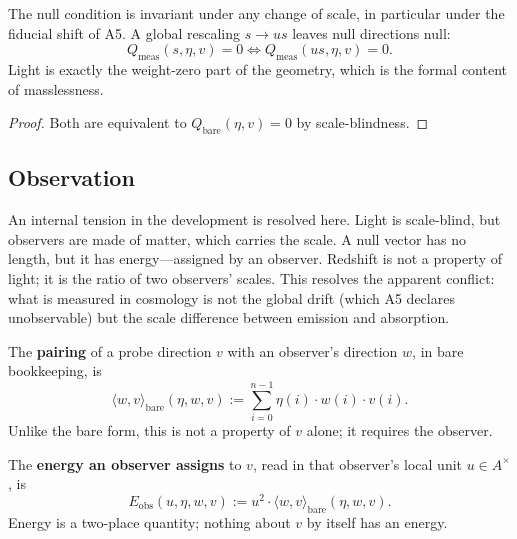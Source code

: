 \begin{theorem}
The null condition is invariant under any change of scale, in particular under the fiducial shift of A5. A global rescaling $s \to us$ leaves null directions null:
\begin{equation}
Q_{\text{meas}}(s, \eta, v) = 0 \iff Q_{\text{meas}}(us, \eta, v) = 0 .
\end{equation}
Light is exactly the weight-zero part of the geometry, which is the formal content of masslessness.
\end{theorem}

\begin{proof}
Both are equivalent to $Q_{\text{bare}}(\eta, v) = 0$ by scale-blindness.
\end{proof}

\subsection{Observation}

An internal tension in the development is resolved here. Light is scale-blind, but observers are made of matter, which carries the scale. A null vector has no length, but it has energy—assigned by an observer. Redshift is not a property of light; it is the ratio of two observers' scales. This resolves the apparent conflict: what is measured in cosmology is not the global drift (which A5 declares unobservable) but the scale difference between emission and absorption.

\begin{definition}
The \textbf{pairing} of a probe direction $v$ with an observer's direction $w$, in bare bookkeeping, is
\begin{equation}
\langle w, v \rangle_{\text{bare}}(\eta, w, v) := \sum_{i=0}^{n-1} \eta(i) \cdot w(i) \cdot v(i) .
\end{equation}
Unlike the bare form, this is not a property of $v$ alone; it requires the observer.
\end{definition}

\begin{definition}
The \textbf{energy an observer assigns} to $v$, read in that observer's local unit $u \in A^\times$, is
\begin{equation}
E_{\text{obs}}(u, \eta, w, v) := u^2 \cdot \langle w, v \rangle_{\text{bare}}(\eta, w, v) .
\end{equation}
Energy is a two-place quantity; nothing about $v$ by itself has an energy.
\end{definition}

